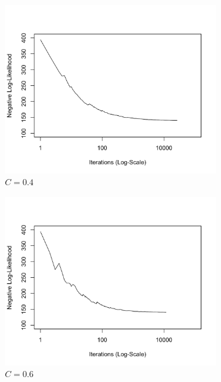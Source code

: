 \documentclass[11 pt]{article}
\begin{document}
\begin{enumerate}[label=(\Alph*)]
\begin{figure}[H]
\begin{center}
\begin{subfigure}[h]{0.45\linewidth}
				\includegraphics[width=\linewidth]{Fig/F2PD04.png}
				\caption{$C=0.4$}
			\end{subfigure}
			\begin{subfigure}[h]{0.45\linewidth}
				\includegraphics[width=\linewidth]{Fig/F2PD06.png}
				\caption{$C=0.6$}
			\end{subfigure}
			\begin{subfigure}[h]{0.45\linewidth}

\end{subfigure}
\end{center}
\end{figure}
\end{enumerate}
\end{document}
